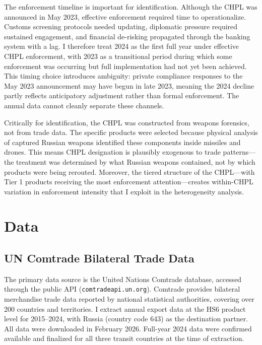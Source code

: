 \documentclass[12pt]{article}
\begin{document}
The enforcement timeline is important for identification. Although the CHPL was announced in May 2023, effective enforcement required time to operationalize. Customs screening protocols needed updating, diplomatic pressure required sustained engagement, and financial de-risking propagated through the banking system with a lag. I therefore treat 2024 as the first full year under effective CHPL enforcement, with 2023 as a transitional period during which some enforcement was occurring but full implementation had not yet been achieved. This timing choice introduces ambiguity: private compliance responses to the May 2023 announcement may have begun in late 2023, meaning the 2024 decline partly reflects anticipatory adjustment rather than formal enforcement. The annual data cannot cleanly separate these channels.

Critically for identification, the CHPL was constructed from weapons forensics, not from trade data. The specific products were selected because physical analysis of captured Russian weapons identified these components inside missiles and drones. This means CHPL designation is plausibly exogenous to trade patterns---the treatment was determined by what Russian weapons contained, not by which products were being rerouted. Moreover, the tiered structure of the CHPL---with Tier 1 products receiving the most enforcement attention---creates within-CHPL variation in enforcement intensity that I exploit in the heterogeneity analysis.


\section{Data}
\label{sec:data}

\subsection{UN Comtrade Bilateral Trade Data}

The primary data source is the United Nations Comtrade database, accessed through the public API (\texttt{comtradeapi.un.org}). Comtrade provides bilateral merchandise trade data reported by national statistical authorities, covering over 200 countries and territories. I extract annual export data at the HS6 product level for 2015--2024, with Russia (country code 643) as the destination partner. All data were downloaded in February 2026. Full-year 2024 data were confirmed available and finalized for all three transit countries at the time of extraction.
\end{document}
